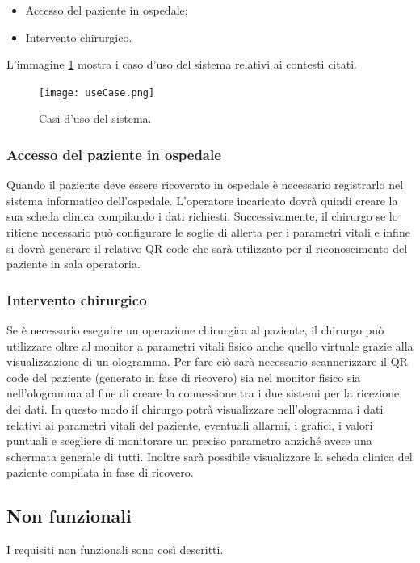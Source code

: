 \begin{itemize}
    \item Accesso del paziente in ospedale;
    \item Intervento chirurgico.
\end{itemize}

L'immagine \ref{pic:use-cases} mostra i caso d'uso del sistema relativi ai contesti citati.

\begin{figure}[ht]
    \texttt{[image: useCase.png]}
    \centering
    \caption{\label{pic:use-cases}Casi d'uso del sistema.}
\end{figure}

\subsubsection{Accesso del paziente in ospedale}
Quando il paziente deve essere ricoverato in ospedale è necessario registrarlo nel sistema informatico dell'ospedale. L'operatore incaricato dovrà quindi creare la sua scheda clinica compilando i dati richiesti. Successivamente, il chirurgo se lo ritiene necessario può configurare le soglie di allerta per i parametri vitali e infine si dovrà generare il relativo QR code che sarà utilizzato per il riconoscimento del paziente in sala operatoria.

\subsubsection{Intervento chirurgico}
Se è necessario eseguire un operazione chirurgica al paziente, il chirurgo può utilizzare oltre al monitor a parametri vitali fisico anche quello virtuale grazie alla visualizzazione di un ologramma. Per fare ciò sarà necessario scannerizzare il QR code del paziente (generato in fase di ricovero) sia nel monitor fisico sia nell'ologramma al fine di creare la connessione tra i due sistemi per la ricezione dei dati. In questo modo il chirurgo potrà visualizzare nell'ologramma i dati relativi ai parametri vitali del paziente, eventuali allarmi, i grafici, i valori puntuali e scegliere di monitorare un preciso parametro anziché avere una schermata generale di tutti. Inoltre sarà possibile visualizzare la scheda clinica del paziente compilata in fase di ricovero.

\subsection{Non funzionali}
I requisiti non funzionali sono così descritti.

